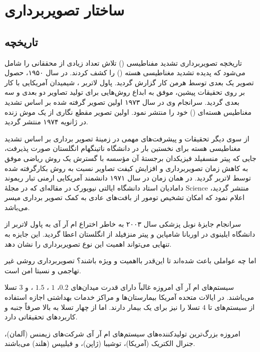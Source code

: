 \section{ساختار تصویربرداری \mri}\label{sec:mri-basics}

\subsection{تاریخچه}


تاریخچه تصویربرداری تشدید مفناطیسی
(\mri)
تلاش تعداد زیادی از محققانی را شامل می‌شود که پدیده تشدید مغناطیسی هسته
()
را کشف کردند.
در سال ۱۹۵۰، حصول تصویر یک بعدی \mri توسط هرمن کار 
 گزارش گردید. پاول لاتربر 
، شیمیدان آمریکایی با کار بر روی تحقیقات پیشین، موفق به ابداع روش‌هایی برای تولید تصاویر دو بعدی و سه بعدی \mri گردید. سرانجام وی در سال ۱۹۷۳ اولین تصویر گرفته شده بر اساس تشدید مغناطیس هسته‌ای () خود را منتشر نمود. اولین تصویر مقطع نگاری از یک موش زنده در ژانویه ۱۹۷۴ منتشر گردید.


از سوی دیگر تحقیقات و پیشرفت‌های مهمی در زمینهٔ تصویر برداری بر اساس تشدید مغناطیسی هسته برای نخستین بار در دانشگاه ناتینگهام انگلستان 
صورت پذیرفت، جایی که پیتر منسفیلد فیزیکدان برجستهٔ آن مؤسسه با گسترش یک روش ریاضی موفق به کاهش زمان تصویربرداری و افزایش کیفت تصاویر نسبت به روش بکارگرفته شده توسط لاتربر گردید. در همان زمان در سال ۱۹۷۱ دانشمند آمریکایی ارمنی تبار ریموند دامادیان استاد دانشگاه ایالتی نیویورک در مقاله‌ای که در مجلهٔ Science منتشر گردید، اعلام نمود که امکان تشخیص تومور از بافت‌های عادی به کمک تصویر برداری 
 میسر می‌باشد.

سرانجام جایزهٔ نوبل پزشکی سال ۲۰۰۳ به خاطر اختراع ام آر آی به پاول لاتربر از دانشگاه ایلینوی در اوربانا شامپاین و پیتر منزفیلد از انگلستان اعطا گردید. 
این جایزه به تنهایی می‌تواند اهمیت این نوع تصویربرداری را نشان دهد.

اما چه عواملی باعث شده‌اند تا این‌قدر \mri بااهمیت و ویژه باشند؟ تصویربرداری \mri روشی غیر تهاجمی و نسبتا امن است. 

سیستم‌های ام آر آی امروزه غالباً دارای قدرت میدان‌های $0.2$، $1$ ، $1.5$ ، و $3$ تسلا می‌باشند.
در ایالات متحده آمریکا بیمارستان‌ها و مراکز خدمات بهداشتی اجازه استفاده از سیستم‌های تا $4$ تسلا را نیز برای یک بیمار دارند. اما از چهار تسلا به بالا صرفاً جنبه و کاربردهای تحقیقاتی دارد.

امروزه بزرگ‌ترین تولیدکننده‌های سیستم‌های ام آر آی شرکت‌های زیمنس (آلمان)، جنرال الکتریک (آمریکا)، توشیبا (ژاپن)، و فیلیپس (هلند) می‌باشند.


